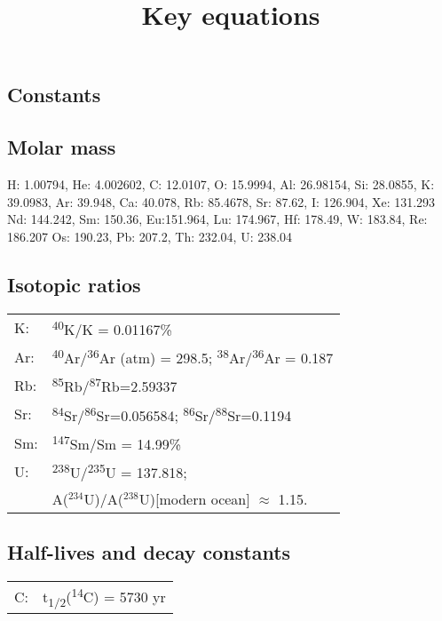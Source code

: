 \documentclass{article}
\title{Key equations}
\author{\vspace{-5ex}}
\date{\vspace{-5ex}}
\begin{document}
\begin{multicols}{3}

\section{Constants}

\subsection{Molar mass}

H: 1.00794, He: 4.002602, C: 12.0107, O: 15.9994, Al: 26.98154, Si:
28.0855, K: 39.0983, Ar: 39.948, Ca: 40.078, Rb: 85.4678, Sr: 87.62,
I: 126.904, Xe: 131.293 Nd: 144.242, Sm: 150.36, Eu:151.964, Lu:
174.967, Hf: 178.49, W: 183.84, Re: 186.207 Os: 190.23, Pb: 207.2, Th:
232.04, U: 238.04

\subsection{Isotopic ratios}

\begin{tabular}{p{.03\linewidth}p{.9\linewidth}}
K: & \textsuperscript{40}K/K = 0.01167\% \\

Ar: & \textsuperscript{40}Ar/\textsuperscript{36}Ar (atm) = 298.5;
\textsuperscript{38}Ar/\textsuperscript{36}Ar = 0.187 \\

Rb: & \textsuperscript{85}Rb/\textsuperscript{87}Rb=2.59337 \\

Sr: & \textsuperscript{84}Sr/\textsuperscript{86}Sr=0.056584;
\textsuperscript{86}Sr/\textsuperscript{88}Sr=0.1194 \\

Sm: & \textsuperscript{147}Sm/Sm = 14.99\% \\

U: & \textsuperscript{238}U/\textsuperscript{235}U = 137.818; \\
~ & A($^{234}$U)/A($^{238}$U)[modern ocean] $\approx$ 1.15.

\end{tabular}

\subsection{Half-lives and decay constants}

\begin{tabular}{p{.03\linewidth}p{.9\linewidth}}
C: & t\textsubscript{1/2}(\textsuperscript{14}C) = 5730 yr \\


\end{tabular}
\end{multicols}
\end{document}
